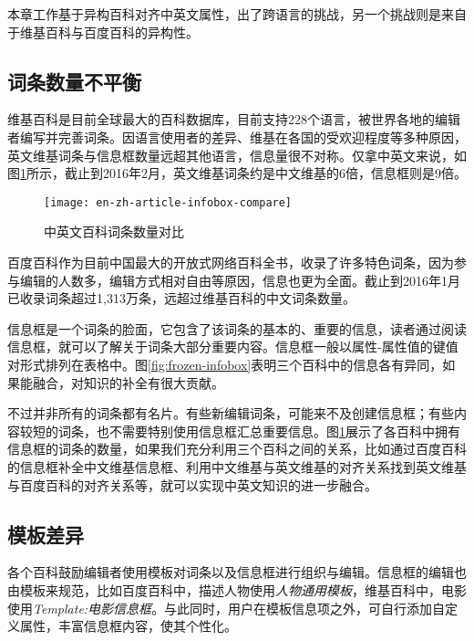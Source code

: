 本章工作基于异构百科对齐中英文属性，出了跨语言的挑战，另一个挑战则是来自于维基百科与百度百科的异构性。

\subsection{词条数量不平衡}

维基百科是目前全球最大的百科数据库，目前支持228个语言，被世界各地的编辑者编写并完善词条。因语言使用者的差异、维基在各国的受欢迎程度等多种原因，英文维基词条与信息框数量远超其他语言，信息量很不对称。仅拿中英文来说，如图\ref{fig:en-zh-article-infobox-compare}所示，截止到2016年2月，英文维基词条约是中文维基的6倍，信息框则是9倍。

\begin{figure}[H]
  \centering
  \texttt{[image: en-zh-article-infobox-compare]}
  \caption{中英文百科词条数量对比}
  \label{fig:en-zh-article-infobox-compare}
\end{figure}

百度百科作为目前中国最大的开放式网络百科全书，收录了许多特色词条，因为参与编辑的人数多，编辑方式相对自由等原因，信息也更为全面。截止到2016年1月已收录词条超过1,313万条，远超过维基百科的中文词条数量。

信息框是一个词条的脸面，它包含了该词条的基本的、重要的信息，读者通过阅读信息框，就可以了解关于词条大部分重要内容。信息框一般以属性-属性值的键值对形式排列在表格中。图\ref{fig:frozen-infobox}表明三个百科中的信息各有异同，如果能融合，对知识的补全有很大贡献。

不过并非所有的词条都有名片。有些新编辑词条，可能来不及创建信息框；有些内容较短的词条，也不需要特别使用信息框汇总重要信息。图\ref{fig:en-zh-article-infobox-compare}展示了各百科中拥有信息框的词条的数量，如果我们充分利用三个百科之间的关系，比如通过百度百科的信息框补全中文维基信息框、利用中文维基与英文维基的对齐关系找到英文维基与百度百科的对齐关系等，就可以实现中英文知识的进一步融合。

\subsection{模板差异}

各个百科鼓励编辑者使用模板对词条以及信息框进行组织与编辑。信息框的编辑也由模板来规范，比如百度百科中，描述人物使用\textit{人物通用模板}，维基百科中，电影使用\textit{Template:电影信息框}。与此同时，用户在模板信息项之外，可自行添加自定义属性，丰富信息框内容，使其个性化。

